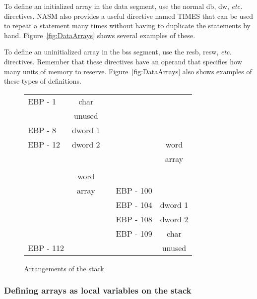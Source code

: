 To define an initialized array in the {\code data} segment, use the
normal {\code db}, {\code dw}, \emph{etc.}
directives. NASM also provides a useful directive
named {\code TIMES}  that can be used to repeat a statement many times
without having to duplicate the statements by hand.
Figure~\ref{fig:DataArrays} shows several examples of these.

To define an uninitialized array in the {\code bss} segment, use the
{\code resb}, {\code resw}, \emph{etc.} 
directives. Remember that these directives have an operand that
specifies how many units of memory to
reserve. Figure~\ref{fig:DataArrays} also shows examples of these
types of definitions.

\begin{figure}[t]
\centering
\begin{tabular}{l|c|ll|c|}
\cline{2-2} \cline{5-5}
EBP - 1  & char    & \hspace{2em} &           & \\
\cline{2-2}
         & unused  &              &           & \\
\cline{2-2}
EBP - 8  & dword 1 &              &           & \\
\cline{2-2}
EBP - 12 & dword 2 &              &           & word \\
\cline{2-2}
         &         &              &           & array \\
         &         &              &           & \\
         & word    &              &           & \\
         & array   &              & EBP - 100 & \\
\cline{5-5}
         &         &              & EBP - 104 & dword 1 \\
\cline{5-5}
         &         &              & EBP - 108 & dword 2 \\
\cline{5-5}
         &         &              & EBP - 109 & char \\
\cline{5-5}
EBP - 112 &        &              &           & unused \\
\cline{2-2} \cline{5-5}
\end{tabular}
\caption{Arrangements of the stack\label{fig:StackLayouts}}
\end{figure}

\subsubsection{Defining arrays as local variables on the stack}

